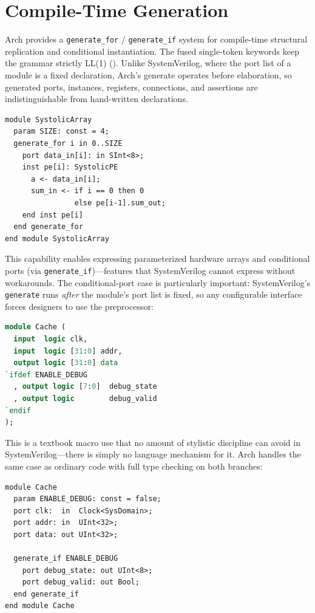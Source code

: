 \documentclass[11pt,twocolumn]{article}
\begin{document}
\section{Compile-Time Generation}\label{sec:generate}

Arch provides a \texttt{generate\_for} / \texttt{generate\_if} system for compile-time structural replication and conditional instantiation. The fused single-token keywords keep the grammar strictly LL(1) (). Unlike SystemVerilog, where the port list of a module is a fixed declaration, Arch's generate operates before elaboration, so generated ports, instances, registers, connections, and assertions are indistinguishable from hand-written declarations.

\begin{lstlisting}[language=Arch,caption={Generate-for iteration},label={lst:gen}]
module SystolicArray
  param SIZE: const = 4;
  generate_for i in 0..SIZE
    port data_in[i]: in SInt<8>;
    inst pe[i]: SystolicPE
      a <- data_in[i];
      sum_in <- if i == 0 then 0
                else pe[i-1].sum_out;
    end inst pe[i]
  end generate_for
end module SystolicArray
\end{lstlisting}

This capability enables expressing parameterized hardware arrays and conditional ports (via \texttt{generate\_if})---features that SystemVerilog cannot express without workarounds. The conditional-port case is particularly important: SystemVerilog's \texttt{generate} runs \emph{after} the module's port list is fixed, so any configurable interface forces designers to use the preprocessor:

\begin{lstlisting}[language=SystemVerilog,caption={SystemVerilog forces preprocessor for conditional ports}]
module Cache (
  input  logic clk,
  input  logic [31:0] addr,
  output logic [31:0] data
`ifdef ENABLE_DEBUG
  , output logic [7:0]  debug_state
  , output logic        debug_valid
`endif
);
\end{lstlisting}

This is a textbook macro use that no amount of stylistic discipline can avoid in SystemVerilog---there is simply no language mechanism for it. Arch handles the same case as ordinary code with full type checking on both branches:

\begin{lstlisting}[language=Arch,caption={Conditional ports in Arch via generate\_if},label={lst:gencond}]
module Cache
  param ENABLE_DEBUG: const = false;
  port clk:  in  Clock<SysDomain>;
  port addr: in  UInt<32>;
  port data: out UInt<32>;

  generate_if ENABLE_DEBUG
    port debug_state: out UInt<8>;
    port debug_valid: out Bool;
  end generate_if
end module Cache
\end{lstlisting}
\end{document}
